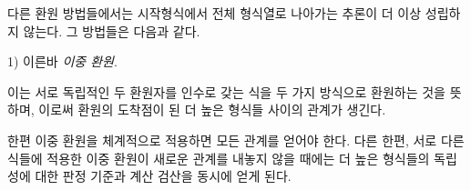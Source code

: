 
다른 환원 방법들에서는 시작형식에서 전체 형식열로 나아가는 추론이 더 이상 성립하지 않는다. 그 방법들은 다음과 같다.

1) 이른바 \emph{\glqq{}이중 환원\grqq{}}.

이는 서로 독립적인 두 환원자를 인수로 갖는 식을 두 가지 방식으로 환원하는 것을 뜻하며, 이로써 환원의 도착점이 된 더 높은 형식들 사이의 관계가 생긴다.

한편 \glqq{}이중 환원\grqq{}을 체계적으로 적용하면 모든 관계를 얻어야 한다. 다른 한편, 서로 다른 식들에 적용한 \glqq{}이중 환원\grqq{}이 새로운 관계를 내놓지 않을 때에는 더 높은 형식들의 독립성에 대한 판정 기준과 계산 검산을 동시에 얻게 된다.
